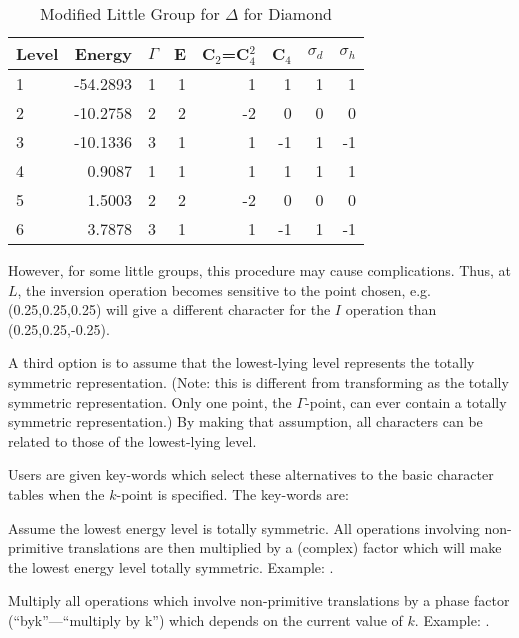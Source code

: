 \begin{table}
\begin{center}
\caption{\label{mdig} Modified Little Group for $\Delta$ for Diamond}
\begin{tabular}{lrlrrrrr} \\ \hline
Level&Energy&$\Gamma$&E &C$_2$=C$_4^2$ &C$_4$&$\sigma_d$
&$\sigma_h$  \\ \hline
  1& -54.2893 &1 & 1& 1& 1     &   1& 1    \\
  2& -10.2758 &2 & 2&-2& 0     &   0& 0              \\
  3& -10.1336 &3 & 1& 1&-1     &   1& -1    \\
  4&   0.9087 &1 & 1& 1& 1     &   1& 1    \\
  5&   1.5003 &2 & 2&-2& 0     &   0& 0  \\
  6&   3.7878 &3 & 1& 1&-1     &   1& -1   \\ \hline
\end{tabular}\end{center}\end{table}

However, for some little groups, this procedure may cause complications. Thus,
at $L$, the inversion operation becomes sensitive to the point chosen, e.g.
(0.25,0.25,0.25) will give a different character for the $I$ operation than
(0.25,0.25,-0.25).

A third option is to assume that the lowest-lying level represents the totally
symmetric representation.  (Note: this is different from transforming as the
totally symmetric representation.  Only one point, the $\Gamma$-point, can ever
contain a totally symmetric representation.) By making that assumption, all
characters can be related to those of the  lowest-lying level.

Users are given key-words which select these alternatives to the basic
character tables when the $k$-point is specified.  The key-words are:

\begin{description}
\item[\comp{one}] Assume the lowest energy level is totally symmetric.  All operations
involving non-primitive translations are then multiplied by a (complex) factor
which will make the lowest energy level totally symmetric. Example: .

\item[\comp{byk}] Multiply all operations which involve non-primitive translations by
a phase factor (``byk''---``multiply by k'')  which depends on the current value
of $k$. Example: .
\end{description}

